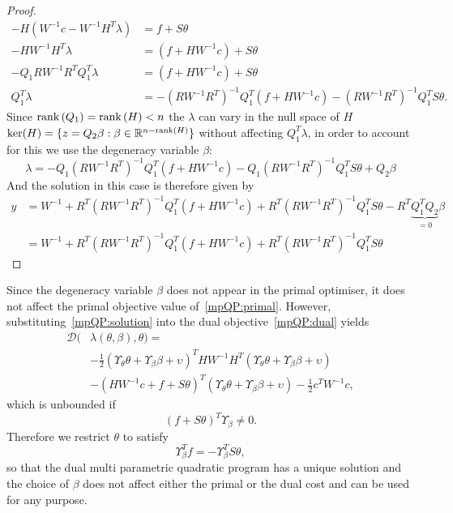 \begin{proof}
\begin{equation}
\begin{aligned}
-H(W^{-1} c- W^{-1}H^{T}\lambda) &= f+S\theta\\
-HW^{-1}H^T\lambda &= (f+HW^{-1}c) + S\theta\\
-Q_1RW^{-1}R^TQ_1^T\lambda &= (f+HW^{-1}c) + S\theta\\
Q_1^T\lambda &=-(RW^{-1}R^T)^{-1}Q_1^T(f+HW^{-1}c) - (RW^{-1}R^T)^{-1}Q_1^TS\theta.
\end{aligned}\end{equation}
%
Since $\text{rank}\left(Q_1\right)=\text{rank}\left(H\right)<n$ the $\lambda$ can vary in the null space of $H$ $\text{ker}(H) = \{z=Q_2\beta:\beta\in\mathbb R^{n-\text{rank}\left(H\right)}\}$ without affecting $Q_1^T\lambda$, in order to account for this we use the degeneracy variable $\beta$:
%
\begin{equation}
	\lambda = -Q_1(RW^{-1}R^T)^{-1}Q_1^T(f+HW^{-1}c) - Q_1(RW^{-1}R^T)^{-1}Q_1^TS\theta+Q_2\beta
\end{equation}
%
And the solution in this case is therefore given by
%
\begin{equation}\begin{aligned}
	y &= W^{-1}+R^T (RW^{-1}R^T)^{-1}Q_1^T(f+HW^{-1}c) + R^T (RW^{-1}R^T)^{-1}Q_1^TS\theta - R^T \underbrace{Q_1^TQ_2}_{=0}\beta\\
&=W^{-1}+R^T (RW^{-1}R^T)^{-1}Q_1^T(f+HW^{-1}c) + R^T (RW^{-1}R^T)^{-1}Q_1^TS\theta
\end{aligned}\end{equation}
%
\end{proof}
%
\noindent Since the degeneracy variable $\beta$ does not appear in the primal optimiser, it does not affect the primal objective value of~\eqref{mpQP:primal}.
%
However, substituting~\eqref{mpQP:solution} into the dual objective~\eqref{mpQP:dual} yields
%
\begin{align*}
\mathcal D(&\lambda(\theta,\beta),\theta) = \\
& {-\tfrac{1}{2}}(\Upsilon_\theta \theta + \Upsilon_\beta \beta + \upsilon)^T H W^{-1}H^T 
	(\Upsilon_\theta \theta + \Upsilon_\beta \beta + \upsilon)\\
& -(HW^{-1}c + 
	f + S\theta)^T(\Upsilon_\theta \theta + \Upsilon_\beta \beta + \upsilon) -\tfrac{1}{2}c^TW^{-1}c,
\end{align*}
%
which is unbounded if
\[
	(f+S\theta)^T \Upsilon_\beta \neq 0 .
\]
%
Therefore we restrict $\theta$ to satisfy 
%
\begin{equation}\label{mpQP:compatability:assumption}
	\Upsilon_\beta^Tf = -\Upsilon_\beta^TS\theta,
\end{equation} 
%
so that the dual multi parametric quadratic program has a unique solution and the choice of $\beta$ does not affect either the primal or the dual cost and can be used for any purpose. 
